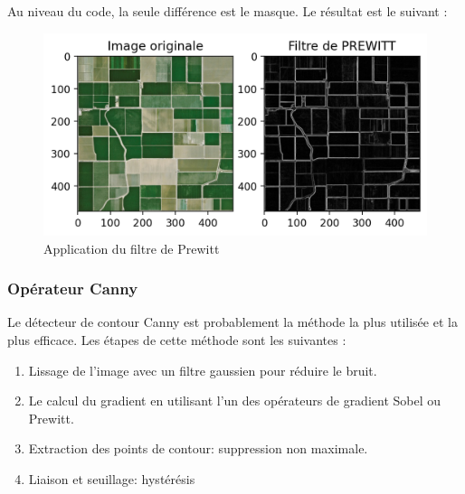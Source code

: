 \documentclass[12pt, openany]{report}
\begin{document}
Au niveau du code, la seule différence est le masque.
Le résultat est le suivant : 
\begin{figure}[H]
\centering
\includegraphics[scale=1.2]{prewitt_result.png}
\caption{Application du filtre de Prewitt}
\end{figure}

\subsubsection{Opérateur Canny}
Le détecteur de contour Canny est probablement la méthode la plus utilisée et la plus efficace.
\noindent Les étapes de cette méthode sont les suivantes :
\begin{enumerate}
    \item Lissage de l'image avec un filtre gaussien pour réduire le bruit.
    \item Le calcul du gradient en utilisant l'un des opérateurs de gradient Sobel ou Prewitt.
    \item Extraction des points de contour: suppression non maximale.
    \item Liaison et seuillage: hystérésis
\end{enumerate}
\end{document}
